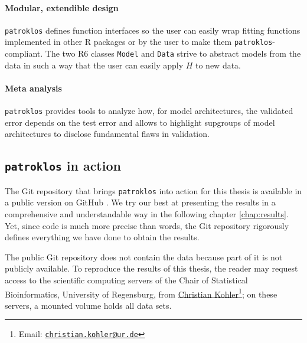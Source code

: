 \paragraph{Modular, extendible design} 
\texttt{patroklos} defines function interfaces so the user 
can easily wrap fitting functions implemented in other R packages or by the user to make 
them \texttt{patroklos}-compliant. The two R6 classes \texttt{Model} and \texttt{Data}
strive to abstract models from the data in such a way that the user can easily apply $H$ to new 
data.

\paragraph{Meta analysis} 
\texttt{patroklos} provides tools to analyze how, for model architectures, the validated error 
depends on the test error and allows to highlight supgroups of model 
architectures to disclose fundamental flaws in validation.

\subsection{\texttt{patroklos} in action}

The Git repository that brings \texttt{patroklos} into action for this thesis is available in a 
public version on GitHub \cite{thesis-gh}. We try our best at presenting the results in a 
comprehensive and understandable way in the following chapter \ref{chap:results}. Yet, since code 
is much more precise than words, the Git repository rigorously defines everything we have done to 
obtain the results.

The public Git repository does not contain the data because part of it is not publicly available.
To reproduce the results of this thesis, the reader may request access to the scientific computing 
servers of the Chair of Statistical Bioinformatics, University of Regensburg, from 
\href{mailto:christian.kohler@ur.de}{Christian Kohler}\footnote{Email: 
\href{mailto:christian.kohler@ur.de}{\texttt{christian.kohler@ur.de}}}; on these servers, a mounted
volume holds all data sets.